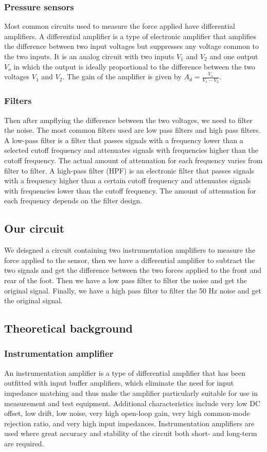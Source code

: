 \subsubsection{Pressure sensors}
Most common circuits used to measure the force applied have differential amplifiers. A differential amplifier is a type of electronic amplifier that amplifies the difference between two input voltages but suppresses any voltage common to the two inputs. It is an analog circuit with two inputs $V_{1}$ and $V_{2}$ and one output $V_{o}$ in which the output is ideally proportional to the difference between the two voltages $V_{1}$ and $V_{2}$. The gain of the amplifier is given by $A_{d} = \frac{V_{o}}{V_{1} - V_{2}}$.
\\
\subsubsection{Filters}
Then after ampflying the difference between the two voltages, we need to filter the noise. The most common filters used are low pass filters and high pass filters. A low-pass filter is a filter that passes signals with a frequency lower than a selected cutoff frequency and attenuates signals with frequencies higher than the cutoff frequency. The actual amount of attenuation for each frequency varies from filter to filter. A high-pass filter (HPF) is an electronic filter that passes signals with a frequency higher than a certain cutoff frequency and attenuates signals with frequencies lower than the cutoff frequency. The amount of attenuation for each frequency depends on the filter design.
\\
\subsection{Our circuit}
We deisgned a circuit containing two instrumentation amplifiers to measure the force applied to the sensor, then we have a differential amplifier to subtract the two signals and get the difference between the two forces applied to the front and rear of the foot. Then we have a low pass filter to filter the noise and get the original signal. Finally, we have a high pass filter to filter the 50 Hz noise and get the original signal.

\subsection{Theoretical background}
\subsubsection{Instrumentation amplifier}
An instrumentation amplifier is a type of differential amplifier that has been outfitted with input buffer amplifiers, which eliminate the need for input impedance matching and thus make the amplifier particularly suitable for use in measurement and test equipment. Additional characteristics include very low DC offset, low drift, low noise, very high open-loop gain, very high common-mode rejection ratio, and very high input impedances. Instrumentation amplifiers are used where great accuracy and stability of the circuit both short- and long-term are required.
\\
